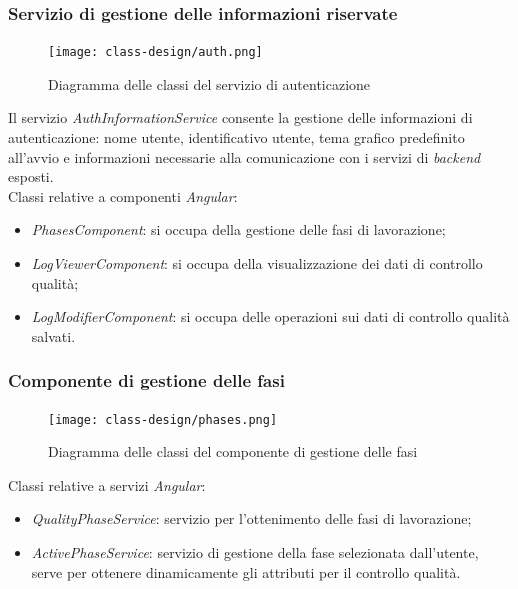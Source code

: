 \subsubsection*{Servizio di gestione delle informazioni riservate}
\begin{figure}[H]
    \centering
    \texttt{[image: class-design/auth.png]}
    \caption{Diagramma delle classi del servizio di autenticazione}
\end{figure}

Il servizio \textit{AuthInformationService} consente la gestione delle informazioni di autenticazione: nome utente, identificativo utente, tema grafico predefinito all'avvio e informazioni necessarie alla comunicazione con i servizi di \textit{backend} esposti.\\
Classi relative a componenti \textit{Angular}:
\begin{itemize}
    \item \textit{PhasesComponent}: si occupa della gestione delle fasi di lavorazione;
    \item \textit{LogViewerComponent}: si occupa della visualizzazione dei dati di controllo qualità;
    \item \textit{LogModifierComponent}: si occupa delle operazioni sui dati di controllo qualità salvati.
\end{itemize}

\subsubsection*{Componente di gestione delle fasi}
\begin{figure}[H]
    \centering
    \texttt{[image: class-design/phases.png]}
    \caption{Diagramma delle classi del componente di gestione delle fasi}
\end{figure}
Classi relative a servizi \textit{Angular}:
\begin{itemize}
    \item \textit{QualityPhaseService}: servizio per l'ottenimento delle fasi di lavorazione;
    \item \textit{ActivePhaseService}: servizio di gestione della fase selezionata dall'utente, serve per ottenere dinamicamente gli attributi per il controllo qualità.
\end{itemize}

